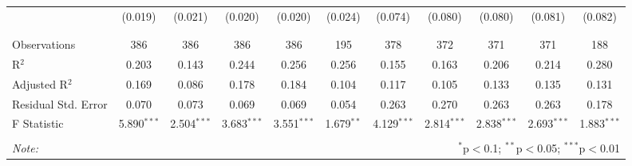 \begin{table}[H]
\begin{tabular}{@{\extracolsep{4pt}}lcccccccccc}
  & (0.019) & (0.021) & (0.020) & (0.020) & (0.024) & (0.074) & (0.080) & (0.080) & (0.081) & (0.082) \\ 
  & & & & & & & & & & \\ 
\hline \\[-1.8ex] 
Observations & 386 & 386 & 386 & 386 & 195 & 378 & 372 & 371 & 371 & 188 \\ 
R$^{2}$ & 0.203 & 0.143 & 0.244 & 0.256 & 0.256 & 0.155 & 0.163 & 0.206 & 0.214 & 0.280 \\ 
Adjusted R$^{2}$ & 0.169 & 0.086 & 0.178 & 0.184 & 0.104 & 0.117 & 0.105 & 0.133 & 0.135 & 0.131 \\ 
Residual Std. Error & 0.070 & 0.073 & 0.069 & 0.069 & 0.054 & 0.263 & 0.270 & 0.263 & 0.263 & 0.178 \\ 
F Statistic & 5.890$^{***}$ & 2.504$^{***}$ & 3.683$^{***}$ & 3.551$^{***}$ & 1.679$^{**}$ & 4.129$^{***}$ & 2.814$^{***}$ & 2.838$^{***}$ & 2.693$^{***}$ & 1.883$^{***}$ \\ 
\hline 
\hline \\[-1.8ex] 
\textit{Note:}  & \multicolumn{10}{r}{$^{*}$p$<$0.1; $^{**}$p$<$0.05; $^{***}$p$<$0.01} \\ 
\end{tabular} 
\end{table} 
